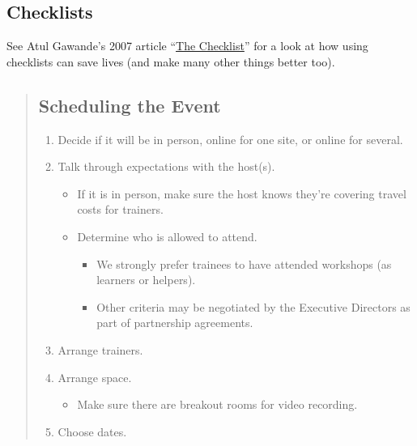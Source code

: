 
\subsection{Checklists}\label{checklists}

See Atul Gawande's 2007 article
``\href{http://www.newyorker.com/magazine/2007/12/10/the-checklist}{The
Checklist}'' for a look at how using checklists can save lives (and make
many other things better too).

\begin{quote}
\subsection{Scheduling the Event}\label{scheduling-the-event}

\begin{enumerate}
\def\labelenumi{\arabic{enumi}.}
\itemsep1pt\parskip0pt
\item
  Decide if it will be in person, online for one site, or online for
  several.
\item
  Talk through expectations with the host(s).

  \begin{itemize}
  \itemsep1pt\parskip0pt
  \item
    If it is in person, make sure the host knows they're covering travel
    costs for trainers.
  \item
    Determine who is allowed to attend.

    \begin{itemize}
    \itemsep1pt\parskip0pt
    \item
      We strongly prefer trainees to have attended workshops (as
      learners or helpers).
    \item
      Other criteria may be negotiated by the Executive Directors as
      part of partnership agreements.
    \end{itemize}
  \end{itemize}
\item
  Arrange trainers.
\item
  Arrange space.

  \begin{itemize}
  \itemsep1pt\parskip0pt
  \item
    Make sure there are breakout rooms for video recording.
  \end{itemize}
\item
  Choose dates.


\end{enumerate}
\end{quote}

